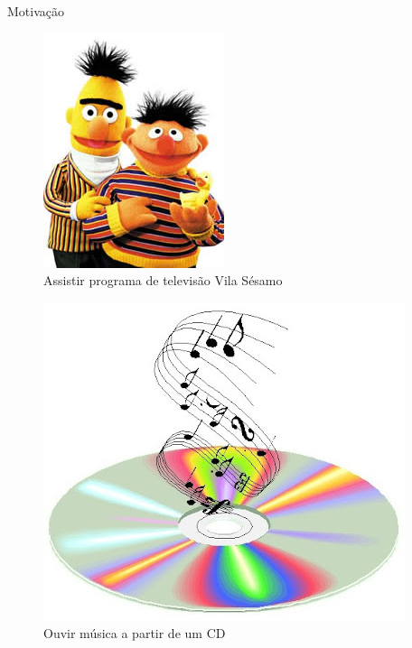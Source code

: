   \begin{frame}{Motivação}
   \begin{figure}[h]
     \centering
     \includegraphics[scale=.3]{enio-beto.jpg}
     \caption{Assistir programa de televisão Vila Sésamo\cite{WTPI:2012}}
     \label{fig7:tv}
   \end{figure}

   \begin{figure}[h]
     \centering
     \includegraphics[scale=0.2]{music_cd.jpg}
     \caption{Ouvir música a partir de um CD\cite{MNA:2012}}
     \label{fig8:cd}
   \end{figure}
  \end{frame}

